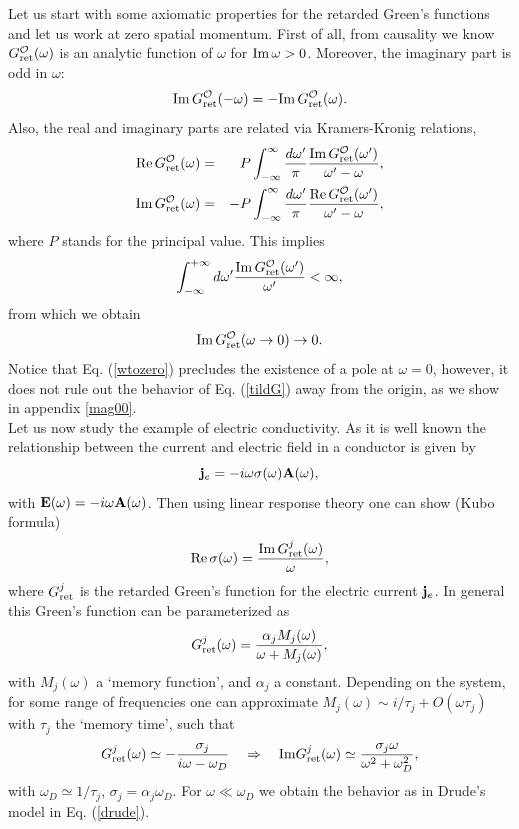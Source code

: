 \documentclass[11pt,amsmath,floats,floatfix,nofootinbib,secnumarabic, superscriptaddress, tightenlines]{revtex4}
\newcommand{\beq}{\begin{equation}}
\newcommand{\eeq}{\end{equation}}
\newcommand{\bea}{\begin{eqnarray}}
\newcommand{\eea}{\end{eqnarray}}
\newcommand{\calo}{{\cal O}}
\begin{document}
{Let us start with some axiomatic properties for the retarded Green's functions and let us work at zero spatial momentum.  First of all, from causality we know $G_{\rm ret}^\calo(\omega)$ is an analytic function of $\omega$ for ${\rm Im}\, \omega>0$. Moreover, the imaginary part is odd in $\omega$:
\beq
\label{prop2}
{\rm Im}\,G_{\rm ret}^\calo(-\omega)=-
{\rm Im}\,G_{\rm ret}^\calo(\omega).
\eeq
Also, the real and imaginary parts are related via Kramers-Kronig relations,
\bea\label{kk}
\text{Re}\,G_{\rm ret}^\calo(\omega) & = & P \int_{-\infty}^\infty \frac{d\omega'}{\pi} \frac{\text{Im}\,G_{\rm ret}^\calo(\omega')}{\omega'-\omega}, \\
\text{Im}\,G_{\rm ret}^\calo(\omega) & = & - P \int_{-\infty}^\infty \frac{d\omega'}{\pi} \frac{\text{Re}\,G_{\rm ret}^\calo(\omega')}{\omega'-\omega},
\eea
where $P$ stands for the principal value. This implies
\beq
\label{prop1}
\int_{-\infty}^{+\infty} d\omega' \frac{{\rm Im}\, G_{\rm ret}^\calo(\omega')}{\omega'} < \infty,
\eeq
from which we obtain
\beq
{\rm Im}\,G_{\rm ret}^\calo(\omega \to 0) \to 0. \label{wtozero}
\eeq
Notice that Eq. (\ref{wtozero}) precludes the existence of a pole at $\omega=0$, however, it does not rule out the behavior of Eq. (\ref{tildG}) away from the origin, as we show in appendix \ref{mag00}.\\

Let us now study the example of electric conductivity. As it is well known  the relationship between the current and electric field in a conductor is given by 
\beq
{\bf j}_e = -i \omega \sigma(\omega) {\bf A}(\omega),
\eeq
with ${\bf E}(\omega) = -i\omega {\bf A}(\omega)$. Then using linear response theory one can show (Kubo formula)
\beq
{\rm Re}\, \sigma(\omega) = \frac{{\rm Im}\, G^j_{\rm ret}(\omega)}{\omega},
\eeq
where $G^j_{\rm ret}$ is the retarded Green's function for the electric current ${\bf j}_e$. In general this Green's function can be parameterized as \cite{forster}
\beq
G^j_{\rm ret}(\omega) = \frac{\alpha_j M_j(\omega)}{\omega + M_j(\omega)},
\eeq
with $M_j(\omega)$ a `memory function', and $\alpha_j$ a constant. Depending on the system, for some range of frequencies one can approximate $M_j(\omega) \sim i/\tau_j + O(\omega\tau_j)$ with $\tau_j$ the `memory time', such that
\beq
\label{Gjret}
G^j_{\rm ret}(\omega) \simeq -\frac{\sigma_j}{i\omega-\omega_D} \quad\Rightarrow\quad {\rm Im} G^j_{\rm ret}(\omega) \simeq \frac{\sigma_j\omega}{\omega^2 + \omega_D^2},
\eeq
with $\omega_D \simeq 1/\tau_j$, $\sigma_j = \alpha_j \omega_D$. For $\omega \ll \omega_D$ we obtain the behavior as in Drude's model in Eq. (\ref{drude}).

}
\end{document}
